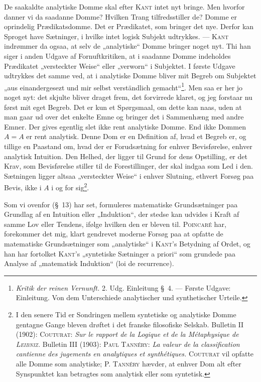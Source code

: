\documentclass[12pt]{article}
\newcommand{\opage}[1]{\marginnote{\footnotesize\textit{[#1]}}}
\begin{document}
De saakaldte analytiske Domme skal efter \textsc{Kant} intet nyt bringe. Men
hvorfor danner vi da saadanne Domme? Hvilken Trang tilfredsstiller de? Domme
er oprindelig Prædikatsdomme. Det er Prædikatet, som bringer det nye. Derfor
kan Sproget have Sætninger, i hvilke intet logisk Subjekt udtrykkes. ---
\textsc{Kant} indrømmer da ogsaa, at selv de „analytiske“ Domme bringer noget
nyt. Thi han siger i anden Udgave af Fornuftkritiken, at i saadanne Domme
indeholdes Prædikatet „versteckter
\setcounter{footnote}{0}%
\opage{41}Weise“ eller „verworn“ i Subjektet. I første Udgave udtrykkes det
samme ved, at i analytiske Domme bliver mit Begreb om Subjektet „aus
einandergesezt und mir selbst verständlich gemacht“\footnote{\textit{Kritik
der reinen Vernunft.} 2. Udg. Einleitung §~4. --- Første Udgave: Einleitung.
Von dem Unterschiede analytischer und synthetischer Urteile.}. Men saa er her
jo noget nyt: det skjulte bliver draget frem, det forvirrede klaret, og jeg
forstaar nu først mit eget Begreb. Det er kun et Spørgsmaal, om dette kan
naas, uden at man gaar ud over det enkelte Emne og bringer det i Sammenhæng med
andre Emner. Der gives egentlig slet ikke rent analytiske Domme. End ikke
Dommen $A = A$ er rent analytisk. Denne Dom er en Definition af, hvad et
Begreb er, og tillige en Paastand om, hvad der er Forudsætning for enhver
Bevisførelse, enhver analytisk Intuition. Den Helhed, der ligger til Grund for
dens Opstilling, er det Krav, som Bevisførelse stiller til de Forestillinger,
der skal indgaa som Led i den. Sætningen ligger altsaa „versteckter Weise“ i
enhver Slutning, ethvert Forsøg paa Bevis, ikke i $A$ i og for sig\footnote{I
den senere Tid er Sondringen mellem syntetiske og analytiske Domme gentagne
Gange bleven drøftet i det franske filosofiske Selskab. Bulletin II (1902):
\textsc{Couturat}: \textit{Sur le rapport de la Logique et de la Métaphysique
de \textsc{Leibniz}.} Bulletin III (1903): \textsc{Paul Tannéry}: \textit{La
valeur de la classification cantienne des jugements en analytiques et
synthétiques.} \textsc{Couturat} vil opfatte alle Domme som analytiske;
\textsc{P. Tannéry} hævder, at enhver Dom alt efter Synspunktet kan betragtes
som analytisk eller som syntetisk.}.

Som vi ovenfor (§~13) har set, formuleres matematiske Grundsætninger paa
Grundlag af en Intuition eller „Induktion“, der stedse kan udvides i Kraft af
samme Lov eller Tendens, ifølge hvilken den er bleven til. \textsc{Poincaré}
har, forekommer det mig, klart gendrevet moderne Forsøg paa at opfatte de
matematiske Grundsætninger som „analytiske“ i \textsc{Kant}'s Betydning af
Ordet, og han har fortolket \textsc{Kant}'s „syntetiske Sætninger a priori“
som grundede paa Analyse af „matematisk Induktion“ (loi de recurrence).
\end{document}
